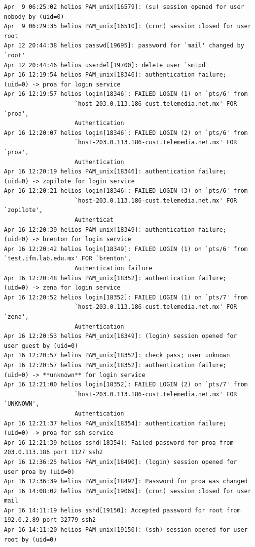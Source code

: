 \begin{lstlisting}[style=terminal]
Apr  9 06:25:02 helios PAM_unix[16579]: (su) session opened for user nobody by (uid=0)
Apr  9 06:29:35 helios PAM_unix[16510]: (cron) session closed for user root
Apr 12 20:44:38 helios passwd[19695]: password for `mail' changed by `root'
Apr 12 20:44:46 helios userdel[19700]: delete user `smtpd'
Apr 16 12:19:54 helios PAM_unix[18346]: authentication failure; (uid=0) -> proa for login service
Apr 16 12:19:57 helios login[18346]: FAILED LOGIN (1) on `pts/6' from 
                    `host-203.0.113.186-cust.telemedia.net.mx' FOR `proa', 
                    Authentication
Apr 16 12:20:07 helios login[18346]: FAILED LOGIN (2) on `pts/6' from 
                    `host-203.0.113.186-cust.telemedia.net.mx' FOR `proa', 
                    Authentication
Apr 16 12:20:19 helios PAM_unix[18346]: authentication failure; (uid=0) -> zopilote for login service
Apr 16 12:20:21 helios login[18346]: FAILED LOGIN (3) on `pts/6' from 
                    `host-203.0.113.186-cust.telemedia.net.mx' FOR `zopilote', 
                    Authenticat
Apr 16 12:20:39 helios PAM_unix[18349]: authentication failure; (uid=0) -> brenton for login service
Apr 16 12:20:42 helios login[18349]: FAILED LOGIN (1) on `pts/6' from `test.ifm.lab.edu.mx' FOR `brenton', 
                    Authentication failure
Apr 16 12:20:48 helios PAM_unix[18352]: authentication failure; (uid=0) -> zena for login service
Apr 16 12:20:52 helios login[18352]: FAILED LOGIN (1) on `pts/7' from 
                    `host-203.0.113.186-cust.telemedia.net.mx' FOR `zena', 
                    Authentication
Apr 16 12:20:53 helios PAM_unix[18349]: (login) session opened for user guest by (uid=0)
Apr 16 12:20:57 helios PAM_unix[18352]: check pass; user unknown
Apr 16 12:20:57 helios PAM_unix[18352]: authentication failure; (uid=0) -> **unknown** for login service
Apr 16 12:21:00 helios login[18352]: FAILED LOGIN (2) on `pts/7' from 
                    `host-203.0.113.186-cust.telemedia.net.mx' FOR `UNKNOWN', 
                    Authentication
Apr 16 12:21:37 helios PAM_unix[18354]: authentication failure; (uid=0) -> proa for ssh service
Apr 16 12:21:39 helios sshd[18354]: Failed password for proa from 203.0.113.186 port 1127 ssh2
Apr 16 12:36:25 helios PAM_unix[18490]: (login) session opened for user proa by (uid=0)
Apr 16 12:36:39 helios PAM_unix[18492]: Password for proa was changed
Apr 16 14:08:02 helios PAM_unix[19069]: (cron) session closed for user mail
Apr 16 14:11:19 helios sshd[19150]: Accepted password for root from 192.0.2.89 port 32779 ssh2
Apr 16 14:11:20 helios PAM_unix[19150]: (ssh) session opened for user root by (uid=0)

\end{lstlisting}
